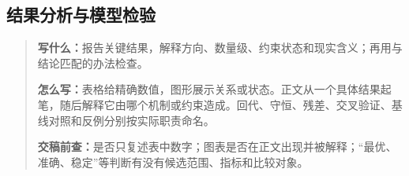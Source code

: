 \subsection{结果分析与模型检验}
\begin{quote}\small
\noindent\textbf{\color{inkblue}写什么：}报告关键结果，解释方向、数量级、约束状态和现实含义；再用与结论匹配的办法检查。\par
\noindent\textbf{\color{inkblue}怎么写：}表格给精确数值，图形展示关系或状态。正文从一个具体结果起笔，随后解释它由哪个机制或约束造成。回代、守恒、残差、交叉验证、基线对照和反例分别按实际职责命名。\par
\noindent\textbf{\color{inkblue}交稿前查：}是否只复述表中数字；图表是否在正文出现并被解释；“最优、准确、稳定”等判断有没有候选范围、指标和比较对象。
\end{quote}

